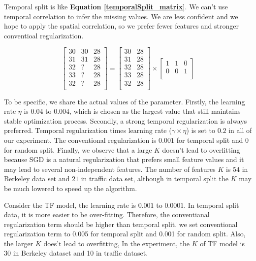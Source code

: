 Temporal split is like \textbf{Equation \ref{temporalSplit_matrix}}.
We can't use temporal correlation to infer the missing values.
We are less confident and we hope to apply the spatial correlation, so we prefer fewer features and stronger conventioal regularization.

\begin{equation}
\label{temporalSplit_matrix}
\begin{bmatrix}
30 & 30 & 28\\
31 & 31 & 28\\
32 &  ? & 28\\
33 &  ? & 28\\
32 &  ? & 28\\
\end{bmatrix} 
= 
\begin{bmatrix}
30 & 28\\
31 & 28\\
32 & 28\\
33 & 28\\
32 & 28\\
\end{bmatrix} 
\times
\begin{bmatrix}
1 & 1 & 0\\
0 & 0 & 1\\
\end{bmatrix} 
\end{equation}

To be specific, we share the actual values of the parameter.
Firstly, the learning rate $\eta$ is $0.04$ to $0.004$, which is chosen as the largest value that still maintains stable optimization process.
Secondly, a strong temporal regularization is always preferred.
Temporal regularization times learning rate ($\gamma \times \eta$) is set to $0.2$ in all of our experiment.
The conventional regularization is $0.001$ for temporal split and $0$ for random split.
Finally, we observe that a large $K$ doesn't lead to overfitting because SGD is a natural regularization that prefers small feature values and it may lead to several non-independent features.
The number of features $K$ is $54$ in Berkeley data set and $21$ in traffic data set, although in temporal split the $K$ may be much lowered to speed up the algorithm. 

Consider the TF model, the learning rate is $0.001$ to $0.0001 $. In temporal split data, it is more easier to be over-fitting. Therefore, the conventianal regularization term should be higher than temporal split. we set conventional regularization term to 0.005 for temporal split and 0.001 for random split. Also, the larger $K$ does't lead to overfitting, In the experiment, the $K$ of TF model  is 30 in Berkeley dataset and 10 in traffic dataset.

